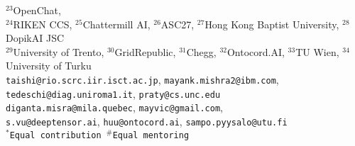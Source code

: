 {$^{23}$OpenChat, \\
$^{24}$RIKEN CCS,
$^{25}$Chattermill AI,
$^{26}$ASC27,
$^{27}$Hong Kong Baptist University,
$^{28}$DopikAI JSC \\
$^{29}$University of Trento,
$^{30}$GridRepublic,
$^{31}$Chegg,
$^{32}$Ontocord.AI,
$^{33}$TU Wien,
$^{34}$University of Turku \\[1ex]
\texttt{taishi@rio.scrc.iir.isct.ac.jp},
\texttt{mayank.mishra2@ibm.com}, \\
\texttt{tedeschi@diag.uniroma1.it},
\texttt{praty@cs.unc.edu} \\
\texttt{diganta.misra@mila.quebec},
\texttt{mayvic@gmail.com}, \\
\texttt{s.vu@deeptensor.ai},
\texttt{huu@ontocord.ai},
\texttt{sampo.pyysalo@utu.fi} \\[1ex]
\texttt{\small $^*$Equal contribution \quad $^\#$Equal mentoring}
}
\vspace{10cm}